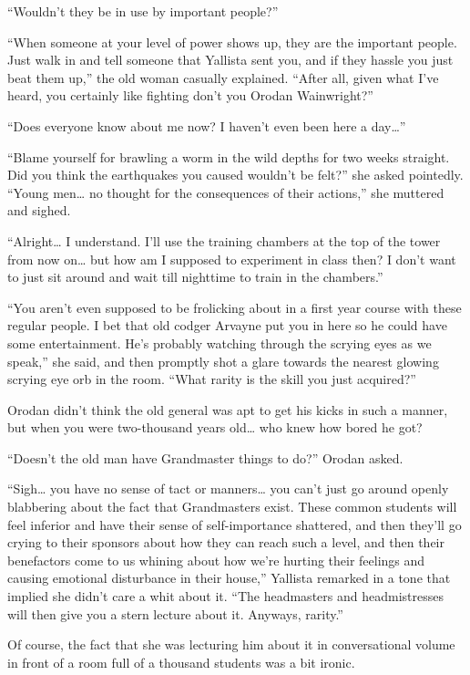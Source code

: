 \documentclass[a4paper,10pt]{book}
\begin{document}
“Wouldn’t they be in use by important people?”\par
“When someone at your level of power shows up, they are the important people. Just walk in and tell someone that Yallista sent you, and if they hassle you just beat them up,” the old woman casually explained. “After all, given what I’ve heard, you certainly like fighting don’t you Orodan Wainwright?”\par
“Does everyone know about me now? I haven’t even been here a day…”\par
“Blame yourself for brawling a worm in the wild depths for two weeks straight. Did you think the earthquakes you caused wouldn’t be felt?” she asked pointedly. “Young men… no thought for the consequences of their actions,” she muttered and sighed.\par
“Alright… I understand. I’ll use the training chambers at the top of the tower from now on… but how am I supposed to experiment in class then? I don’t want to just sit around and wait till nighttime to train in the chambers.”\par
“You aren’t even supposed to be frolicking about in a first year course with these regular people. I bet that old codger Arvayne put you in here so he could have some entertainment. He’s probably watching through the scrying eyes as we speak,” she said, and then promptly shot a glare towards the nearest glowing scrying eye orb in the room. “What rarity is the skill you just acquired?”\par
Orodan didn’t think the old general was apt to get his kicks in such a manner, but when you were two-thousand years old… who knew how bored he got?\par
“Doesn’t the old man have Grandmaster things to do?” Orodan asked.\par
“Sigh… you have no sense of tact or manners… you can’t just go around openly blabbering about the fact that Grandmasters exist. These common students will feel inferior and have their sense of self-importance shattered, and then they’ll go crying to their sponsors about how they can reach such a level, and then their benefactors come to us whining about how we're hurting their feelings and causing emotional disturbance in their house,” Yallista remarked in a tone that implied she didn’t care a whit about it. “The headmasters and headmistresses will then give you a stern lecture about it. Anyways, rarity.”\par
Of course, the fact that she was lecturing him about it in conversational volume in front of a room full of a thousand students was a bit ironic.\par
\end{document}
